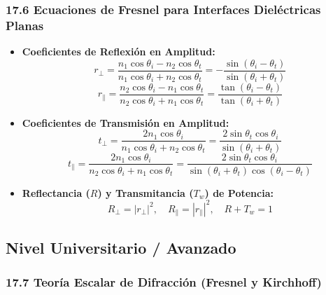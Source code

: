 \documentclass[11pt,a4paper]{article}
\begin{document}
\subsubsection*{17.6 Ecuaciones de Fresnel para Interfaces Dieléctricas Planas}

\begin{itemize}
  \item \textbf{Coeficientes de Reflexión en Amplitud:}
  \[
    r_\perp = \frac{n_1 \cos\theta_i - n_2 \cos\theta_t}{n_1 \cos\theta_i + n_2 \cos\theta_t} = -\frac{\sin(\theta_i - \theta_t)}{\sin(\theta_i + \theta_t)}
  \]
  \[
    r_\parallel = \frac{n_2 \cos\theta_i - n_1 \cos\theta_t}{n_2 \cos\theta_i + n_1 \cos\theta_t} = \frac{\tan(\theta_i - \theta_t)}{\tan(\theta_i + \theta_t)}
  \]
  \item \textbf{Coeficientes de Transmisión en Amplitud:}
  \[
    t_\perp = \frac{2 n_1 \cos\theta_i}{n_1 \cos\theta_i + n_2 \cos\theta_t} = \frac{2 \sin\theta_t \cos\theta_i}{\sin(\theta_i + \theta_t)}
  \]
  \[
    t_\parallel = \frac{2 n_1 \cos\theta_i}{n_2 \cos\theta_i + n_1 \cos\theta_t} = \frac{2 \sin\theta_t \cos\theta_i}{\sin(\theta_i + \theta_t)\cos(\theta_i - \theta_t)}
  \]
  \item \textbf{Reflectancia ($R$) y Transmitancia ($T_w$) de Potencia:}
  \[
    R_\perp = |r_\perp|^2, \quad R_\parallel = |r_\parallel|^2, \quad R + T_w = 1
  \]
\end{itemize}

\subsection*{Nivel Universitario / Avanzado}

\subsubsection*{17.7 Teoría Escalar de Difracción (Fresnel y Kirchhoff)}
\end{document}
